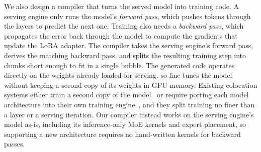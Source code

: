 We also design a compiler that turns the served model into training code.
A serving engine only runs the model's \emph{forward pass}, which pushes tokens through the layers to predict the next one.
Training also needs a \emph{backward pass}, which propagates the error back through the model to compute the gradients that update the \ac{LoRA} adapter.
The compiler takes the serving engine's forward pass, derives the matching backward pass, and splits the resulting training step into chunks short enough to fit in a single bubble.
The generated code operates directly on the weights already loaded for serving, so \sys fine-tunes the model without keeping a second copy of its weights in GPU memory.
Existing colocation systems either train a second copy of the model~\cite{harli} or require porting each model architecture into their own training engine~\cite{flexllm,llmstation}, and they split training no finer than a layer or a serving iteration.
Our compiler instead works on the serving engine's model as-is, including its inference-only \ac{MoE} kernels and expert placement, so supporting a new architecture requires no hand-written kernels for backward passes.


